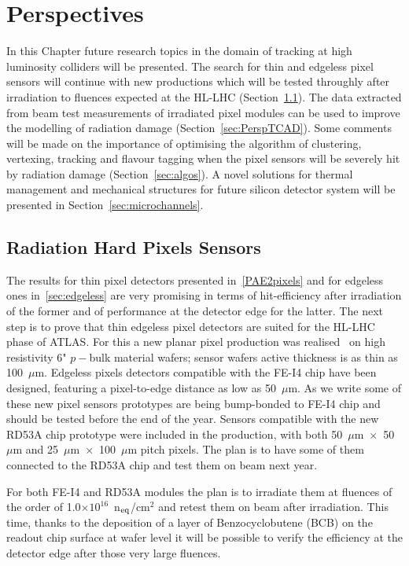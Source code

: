 \chapter{Perspectives}
\label{chap:perspectives}
In this Chapter future research topics in the domain of tracking at high luminosity colliders will be 
presented.
 The search for thin and edgeless pixel sensors will continue with new productions which will 
 be tested throughly after irradiation to fluences expected at the HL-LHC (Section~\ref{sec:PerspPixels}). 
 The data extracted from beam test measurements of irradiated 
 pixel modules can be used to improve the modelling of radiation damage (Section~\ref{sec:PerspTCAD}).
 Some comments will be made on the importance of optimising the 
algorithm of clustering, vertexing, tracking and flavour tagging when the pixel sensors 
will be severely hit by radiation damage (Section~\ref{sec:algos}).
A novel solutions for thermal management and mechanical structures for  future silicon detector system 
will be presented in Section~\ref{sec:microchannels}.



\section{Radiation Hard Pixels Sensors}
\label{sec:PerspPixels}
The results for  thin pixel detectors presented in~\ref{PAE2pixels} and for edgeless 
ones in~\ref{sec:edgeless} are very promising in terms of hit-efficiency after irradiation of the former 
and of performance at the detector edge for the latter. The next step is to prove that 
thin edgeless pixel detectors are suited for the HL-LHC phase of ATLAS. For this a new 
planar pixel production was realised~\cite{SabinaTrentoWS2017} on high resistivity 6" $p-$bulk material 
wafers; sensor wafers active thickness is as thin as 100~$\mu$m. Edgeless pixels detectors 
compatible with the FE-I4 chip  have been designed, featuring a pixel-to-edge distance 
as low as 50~$\mu$m. As we write some of these new pixel sensors prototypes are being bump-bonded 
to FE-I4 chip and should be tested before the end of the year.
Sensors compatible with the new RD53A chip prototype were included in the production, 
with both 50~$\mu$m~$\times$~50~$\mu$m  and 25~$\mu$m~$\times$~100~$\mu$m pitch pixels. 
The plan is to have some of them connected to  the  RD53A chip and test them on beam 
next year.

For both FE-I4 and RD53A modules the plan is to irradiate them at fluences of the order of
 1.0$\times10^{16}$~n$_{\rm eq}$/cm$^2$ and retest them on beam after irradiation. 
This time, thanks to the deposition of   a layer of Benzocyclobutene (BCB) on the readout chip surface at 
wafer level it will be possible to verify the efficiency at the detector edge after those very large fluences. 

